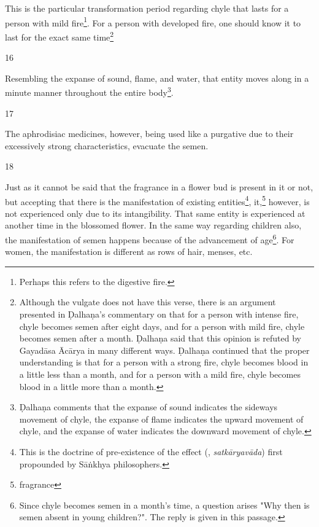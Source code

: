 \begin{translation}
\begin{sloka}
This is the particular transformation period regarding chyle that lasts for a person with mild fire\footnote{Perhaps this refers to the digestive fire.}. For a person with developed fire, one should know it to last for the exact same time\footnote{Although the vulgate does not have this verse, there is an argument presented in Ḍalhaṇa's commentary on  that for a person with intense fire, chyle becomes semen after eight days, and for a person with mild fire, chyle becomes semen after a month. Ḍalhaṇa said that this opinion is refuted by Gayadāsa Ācārya in many different ways. Ḍalhaṇa continued that the proper understanding is that for a person with a strong fire, chyle becomes blood in a little less than a month, and for a person 
with a mild fire, chyle becomes blood in a little more than a month.}


\end{sloka}

\item[16]

Resembling the expanse of sound, flame, and water, that entity moves along in a minute manner throughout the  entire body\footnote{Ḍalhaṇa comments \citep[63]{vulgate} that the expanse of sound indicates the sideways movement of chyle, the expanse of flame indicates the upward movement of chyle, and the expanse of water indicates the downward movement of chyle.}.

\item[17]

The aphrodisiac medicines, however, being used like a purgative due to their excessively strong characteristics, evacuate the semen.      

\item[18]

Just as it cannot be said that the fragrance in a flower bud is present in it or not, but 
accepting that there is the manifestation of existing entities\footnote{This is the 
doctrine of pre-existence of the effect (, \textit{satkāryavāda}) 
first propounded by Sāṅkhya philosophers.}, it,\footnote{fragrance} however, is not 
experienced only due to its intangibility. That same entity is experienced at another 
time in the blossomed flower. In the same way regarding children also, the 
manifestation of semen happens because of the advancement of 
age\footnote{Since chyle becomes semen in a month's time, a question arises "Why 
then is semen absent in young children?". The reply is given in this passage.}. For 
women, the manifestation is different as rows of hair, menses, etc. 


\end{translation}
